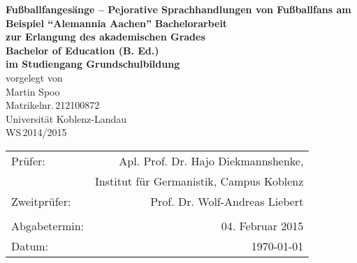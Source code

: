 \begin{titlepage}
	\begin{center}
		\quad
		\vfill
		\Huge{
			 \textbf{Fußballfangesänge – Pejorative Sprachhandlungen von Fußballfans am Beispiel "`Alemannia Aachen"'}
		}
		\vspace{5mm}
		\vfill
		\large{
			{\bfseries Bachelorarbeit\\
			\vspace{5mm}
			\normalfont \rmfamily zur Erlangung des akademischen Grades\\
			\bfseries Bachelor of Education (B. Ed.)\\
			\vspace{5mm}
			\normalfont \rmfamily im Studiengang Grundschulbildung}
		}
		\\
		\vspace{1.5cm}
		\large{
			{vorgelegt von\\
			Martin Spoo\\
			Matrikelnr.\,212100872}
		}
		\vspace{1cm}
		\\
		\Large{
			{Universität Koblenz-Landau}\\
			{WS\,2014/2015}
		}
		\vspace{1cm}
		\begin{table}[b]
			\begin{center}
				\begin{tabular}{lr}
					Prüfer: & Apl. Prof. Dr. Hajo Diekmannshenke, \\
								&	Institut für Germanistik, Campus Koblenz \\
					Zweitprüfer: & Prof. Dr. Wolf-Andreas Liebert \\
					\vspace{0.25cm} \\
					Abgabetermin: & 04. Februar 2015 \\
					Datum: & \today
				\end{tabular}
			\end{center}
		\end{table}
	\end{center}
\end{titlepage}
\renewcommand{\baselinestretch}{1.1}
\restoregeometry

